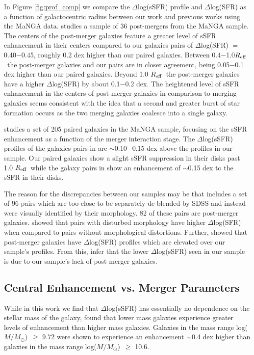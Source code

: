 \documentclass[apj,twocolumn]{emulateapj}
\newcommand{\reff}{$R_{\rm eff}$}
\newcommand{\logm}{log($M/M_{\odot}$)}
\begin{document}
\begin{CJK*}{UTF8}{gbsn}
In Figure \ref{fig:prof_comp} we compare the $\Delta$log(sSFR) profile and $\Delta$log(SFR) as a function of galactocentric radius between our work and previous works using the MaNGA data. \citet{Thorp:2019} studies a sample of 36 post-mergers from the MaNGA sample. The centers of the post-merger galaxies feature a greater level of sSFR enhancement in their centers compared to our galaxies pairs of $\Delta$log(SFR) $=$ 0.40$-$0.45, roughly 0.2 dex higher than our paired galaxies. Between 0.4$-$1.0\reff\ the post-merger galaxies and our pairs are in closer agreement, being 0.05$-$0.1 dex higher than our paired galaxies. Beyond 1.0 \reff\ the post-merger galaxies have a higher $\Delta$log(SFR) by about 0.1$-$0.2 dex. The heightened level of sSFR enhancement in the centers of post-merger galaxies in comparison to merging galaxies seems consistent with the idea that a second and greater burst of star formation occurs as the two merging galaxies coalesce into a single galaxy. 

\citet{Pan:2019} studies a set of 205 paired galaxies in the MaNGA sample, focusing on the sSFR enhancement as a function of the merger interaction stage. The $\Delta$log(sSFR) profiles of the galaxies pairs in \citet{Pan:2019} are $\sim$0.10$-$0.15 dex above the profiles in our sample. Our paired galaxies show a slight sSFR suppression in their disks past 1.0 \reff\ while the galaxy pairs in \citet{Pan:2019} show an enhancement of $\sim$0.15 dex to the sSFR in their disks. 

The reason for the discrepancies between our samples may be that \citet{Pan:2019} includes a set of 96 pairs which are too close to be separately de-blended by SDSS and instead were visually identified by their morphology. 82 of these pairs are post-merger galaxies. \citet{Pan:2019} showed that pairs with disturbed morphology have higher $\Delta$log(SFR) when compared to pairs without morphological distortions. Further, \citet{Thorp:2019} showed that post-merger galaxies have $\Delta$log(SFR) profiles which are elevated over our sample's profiles. From this, infer that the lower $\Delta$log(sSFR) seen in our sample is due to our sample's lack of post-merger galaxies. 

\subsection{Central Enhancement vs. Merger Parameters}

While in this work we find that $\Delta$log(sSFR) has essentially no dependence on the stellar mass of the galaxy, \citet{Li:2008} found that lower mass galaxies experience greater levels of enhancement than higher mass galaxies. Galaxies in the mass range \logm\ $\ge$ 9.72 were shown to experience an enhancement $\sim$0.4 dex higher than galaxies in the mass range \logm\ $\ge$ 10.6. 


\end{CJK*}
\end{document}
